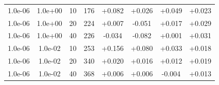 \documentclass[11pt,a4paper]{article}
\begin{document}
\begin{table}
{\begin{tabular}{*{8}c}
  
 1.0e-06 	 & 1.0e+00 	 & 10 & 176 	 & +0.082 & +0.026 & +0.049 & +0.023 \\ 
 1.0e-06 	 & 1.0e+00 	 & 20 & 224 	 & +0.007 & -0.051 & +0.017 & +0.029 \\ 
 1.0e-06 	 & 1.0e+00 	 & 40 & 226 	 & -0.034 & -0.082 & +0.001 & +0.031 \\ 
  
  
 1.0e-06 	 & 1.0e-02 	 & 10 & 253 	 & +0.156 & +0.080 & +0.033 & +0.018 \\ 
 1.0e-06 	 & 1.0e-02 	 & 20 & 340 	 & +0.020 & +0.016 & +0.012 & +0.019 \\ 
 1.0e-06 	 & 1.0e-02 	 & 40 & 368 	 & +0.006 & +0.006 & -0.004 & +0.013 \\ 
\end{tabular}}
\label{TAB::half}
\end{table} 
\end{document}
